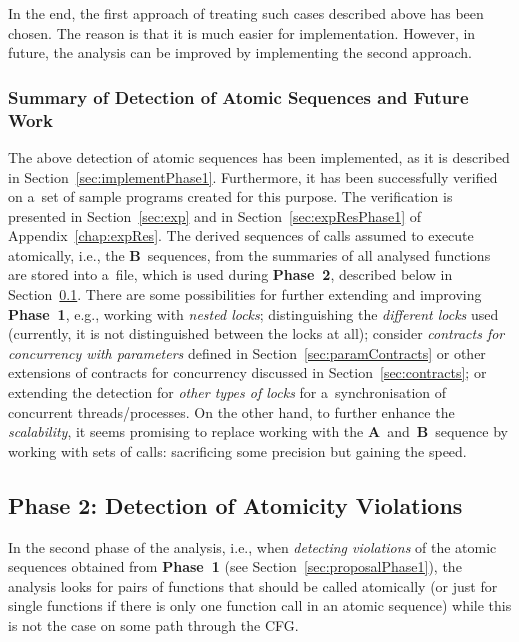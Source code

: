 In the end, the first approach of treating such cases described above has
been chosen. The reason is that it is much easier for implementation.
However, in future, the analysis can be improved by implementing the second
approach.

\subsubsection{Summary of Detection of Atomic Sequences and Future Work}

The above detection of atomic sequences has been implemented, as it is
described in Section~\ref{sec:implementPhase1}. Furthermore, it has
been successfully verified on a~set of sample programs created for
this purpose. The verification is presented in Section~\ref{sec:exp} and
in Section~\ref{sec:expResPhase1} of Appendix~\ref{chap:expRes}. The derived
sequences of calls assumed to execute atomically, i.e., the
\textbf{B}~sequences, from the summaries of all analysed functions are
stored into a~file, which is used during \textbf{Phase~2}, described
below in Section~\ref{sec:proposalPhase2}. There are some possibilities
for further extending and improving \textbf{Phase~1}, e.g., working with
\emph{nested locks}; distinguishing the \emph{different locks} used
(currently, it is not distinguished between the locks at all); consider
\emph{contracts for concurrency with parameters} defined in
Section~\ref{sec:paramContracts} or other extensions of
contracts for concurrency discussed in Section~\ref{sec:contracts}; or
extending the detection for \emph{other types of locks} for a~synchronisation
of concurrent threads/processes. On the other hand, to further enhance the
\emph{scalability}, it seems promising to replace working with the
\textbf{A}~and~\textbf{B}~sequence by working with sets of calls: sacrificing
some precision but gaining the speed.


\subsection{Phase 2: Detection of Atomicity Violations}
\label{sec:proposalPhase2}

In the second phase of the analysis, i.e., when \emph{detecting
violations} of the atomic sequences obtained from \textbf{Phase~1}
(see Section~\ref{sec:proposalPhase1}), the analysis looks for pairs of
functions that should be called atomically (or just for single functions
if there is only one function call in an atomic sequence) while this is
not the case on some path through the CFG.

